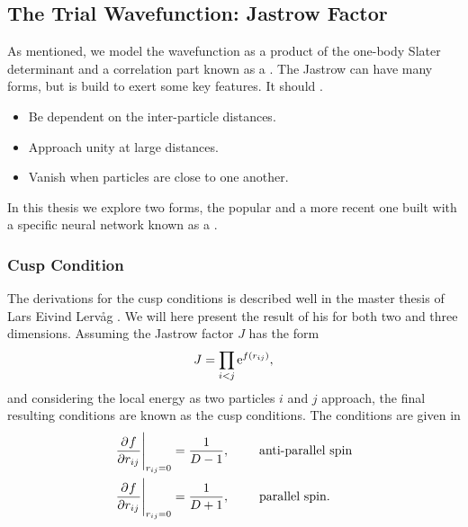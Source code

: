     \subsection{The Trial Wavefunction: Jastrow Factor\label{susec:TWFJastrow}}
        As mentioned, we model the wavefunction as a product of the one-body
        Slater determinant and a correlation part known as a . The Jastrow can have many forms, but is build to exert some
        key features.  It should \cite{jastrow}. 
        \begin{itemize}
            \item Be dependent on the inter-particle distances.
            \item Approach unity at large distances.
            \item Vanish when particles are close to one another.
        \end{itemize}
        In this thesis we explore two forms, the popular
         and a more recent one built with a specific
        neural network known as a .

    \subsubsection{Cusp Condition\label{sususec:cusp_condition}}
        The derivations for the cusp conditions is described well in the master
        thesis of Lars Eivind Lervåg \cite{larsEivindThesis}. We will here
        present the result of his for both two and three dimensions. Assuming
        the Jastrow factor $J$ has the form
            \begin{equation}
                J = \prod_{i<j} \mathrm{e}^{f\left(r_{ij}\right)},
            \end{equation}
        and considering the local energy as two particles $i$ and $j$ approach,
        the final resulting conditions are known as the cusp conditions. The
        conditions are given in 
            \begin{equation} 
                \begin{aligned}
                    \prd{r_{ij}}[f] \Bigg|_{r_{ij}=0} &=
                    \frac{1}{D-1},&\indent& \text{anti-parallel spin} \\
                    \prd{r_{ij}}[f] \Bigg|_{r_{ij}=0} &=
                    \frac{1}{D+1},&\indent& \text{parallel spin}.
                \end{aligned}
                \label{eq:cuspconditionsDef}
            \end{equation}
    
